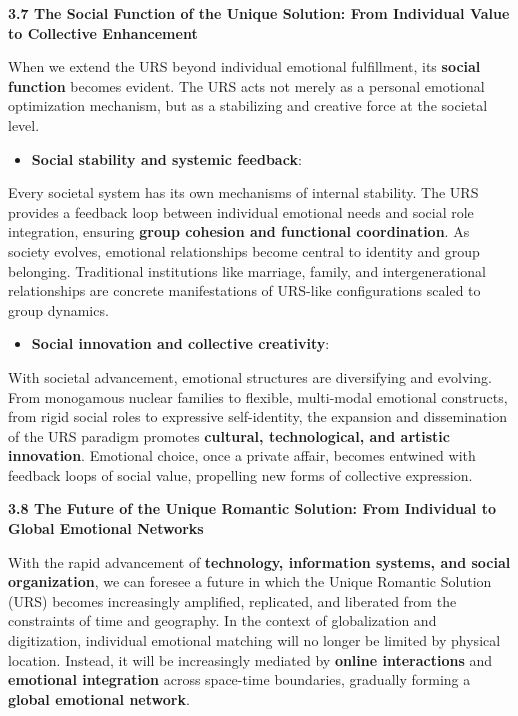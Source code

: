 \documentclass[
]{article}
\begin{document}
\textbf{3.7 The Social Function of the Unique Solution: From Individual
Value to Collective Enhancement}

When we extend the URS beyond individual emotional fulfillment, its
\textbf{social function} becomes evident. The URS acts not merely as a
personal emotional optimization mechanism, but as a stabilizing and
creative force at the societal level.

\begin{itemize}
\item
  \textbf{Social stability and systemic feedback}:
\end{itemize}

Every societal system has its own mechanisms of internal stability. The
URS provides a feedback loop between individual emotional needs and
social role integration, ensuring \textbf{group cohesion and functional
coordination}. As society evolves, emotional relationships become
central to identity and group belonging. Traditional institutions like
marriage, family, and intergenerational relationships are concrete
manifestations of URS-like configurations scaled to group dynamics.

\begin{itemize}
\item
  \textbf{Social innovation and collective creativity}:
\end{itemize}

With societal advancement, emotional structures are diversifying and
evolving. From monogamous nuclear families to flexible, multi-modal
emotional constructs, from rigid social roles to expressive
self-identity, the expansion and dissemination of the URS paradigm
promotes \textbf{cultural, technological, and artistic innovation}.
Emotional choice, once a private affair, becomes entwined with feedback
loops of social value, propelling new forms of collective expression.

\textbf{3.8 The Future of the Unique Romantic Solution: From Individual
to Global Emotional Networks}

With the rapid advancement of \textbf{technology, information systems,
and social organization}, we can foresee a future in which the Unique
Romantic Solution (URS) becomes increasingly amplified, replicated, and
liberated from the constraints of time and geography. In the context of
globalization and digitization, individual emotional matching will no
longer be limited by physical location. Instead, it will be increasingly
mediated by \textbf{online interactions} and \textbf{emotional
integration} across space-time boundaries, gradually forming a
\textbf{global emotional network}.
\end{document}
